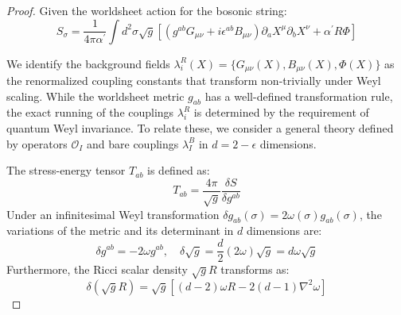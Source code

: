 \begin{tcolorbox}[breakable]
	\begin{proof}		
		Given the worldsheet action for the bosonic string:
		\begin{equation}
			S_{\sigma}=\frac{1}{4 \pi \alpha^{\prime}} \int d^{2} \sigma \sqrt{g}\left[\left(g^{a b} G_{\mu \nu}+i \epsilon^{a b} B_{\mu \nu}\right) \partial_{a} X^{\mu} \partial_{b} X^{\nu}+\alpha^{\prime} R \Phi\right]
		\end{equation}
		
		We identify the background fields $\lambda_i^R(X)=\{G_{\mu\nu}(X), B_{\mu\nu}(X), \Phi(X)\}$ as the renormalized coupling constants that transform non-trivially under Weyl scaling. While the worldsheet metric $g_{ab}$ has a well-defined transformation rule, the exact running of the couplings $\lambda_i^R$ is determined by the requirement of quantum Weyl invariance. To relate these, we consider a general theory defined by operators $\mathcal{O}_I$ and bare couplings $\lambda_I^B$ in $d = 2 - \epsilon$ dimensions.


		The stress-energy tensor $T_{ab}$ is defined as:
		\begin{equation}
			T_{ab} = \frac{4\pi}{\sqrt{g}} \frac{\delta S}{\delta g^{ab}}
		\end{equation}
		Under an infinitesimal Weyl transformation $\delta g_{ab}(\sigma) = 2\omega(\sigma) g_{ab}(\sigma)$, the variations of the metric and its determinant in $d$ dimensions are:
		\begin{equation}
			\delta g^{ab} = -2\omega g^{ab}, \quad \delta \sqrt{g} = \frac{d}{2}(2\omega)\sqrt{g} = d \omega \sqrt{g}
		\end{equation}
		Furthermore, the Ricci scalar density $\sqrt{g}R$ transforms as:
		\begin{equation}
			\delta (\sqrt{g} R) = \sqrt{g} \left[ (d-2)\omega R - 2(d-1) \nabla^2 \omega \right]
		\end{equation}
		

\end{proof}
\end{tcolorbox}
